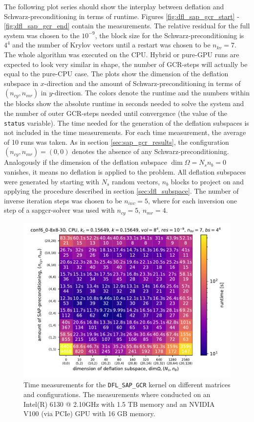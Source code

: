 \documentclass{article}
\theoremstyle{plain} %
\theoremstyle{convention} %
\theoremstyle{remark} %
\def\code#1{\texttt{#1}}
\numberwithin{equation}{section}
\begin{document}
The following plot series should show the interplay between deflation and Schwarz-preconditioning in terms of runtime. Figures \ref{fig:dfl_sap_gcr_start} - \ref{fig:dfl_sap_gcr_end} contain the measurements. The relative residual for the full system was chosen to the $10^{-9}$, the block size for the Schwarz-preconditioning is $4^4$ and the number of Krylov vectors until a restart was chosen to be $n_{kv} = 7$. The whole algorithm was executed on the CPU. Hybrid or pure-GPU runs are expected to look very similar in shape, the number of GCR-steps will actually be equal to the pure-CPU case. The plots show the dimension of the deflation subspace in $x$-direction and the amount of Schwarz-preconditioning in terms of $(n_{cy},n_{mr})$ in $y$-direction. The colors denote the runtime and the numbers within the blocks show the absolute runtime in seconds needed to solve the system and the number of outer GCR-steps needed until convergence (the value of the \code{status} variable). The time needed for the generation of the deflation subspaces is not included in the time measurements. For each time measurement, the average of \num{10} runs was taken. As in section \ref{sec:sap_gcr_results}, the configuration $(n_{cy},n_{mr}) = (0,0)$ denotes the absence of any Schwarz-preconditioning. Analogously if the dimension of the deflation subspace $\dim \Omega = N_s n_b = 0$ vanishes, it means no deflation is applied to the problem. All deflation subspaces were generated by starting with $N_s$ random vectors, $n_b$ blocks to project on and applying the procedure described in section \ref{sec:dfl_subspace}. The number of inverse iteration steps was chosen to be $n_{inv} = 5$, where for each inversion one step of a \acrshort*{sapgcr}-solver was used with $n_{cy} = 5$, $n_{mr} = 4$.

\begin{figure}[h]
    \centering
    \includegraphics[width=1.0\textwidth]{plots/dfl_sap_gcr_conf6_0-8x8-30_8x8x8x8_k_0.15649}
    \caption{Time measurements for the \code{DFL\_SAP\_GCR} kernel on different matrices and configurations. The measurements where conducted on an Intel(R) 6130 @ 2.10GHz with 1.5 TB memory and an NVIDIA V100 (via PCIe) GPU with 16 GB memory.}
    \label{fig:dfl_sap_gcr0}
    \label{fig:dfl_sap_gcr_start}
    \label{fig:dfl_sap_gcr_conf6_0-8x8-30_8x8x8x8_k_0.15649}
\end{figure}
\end{document}
